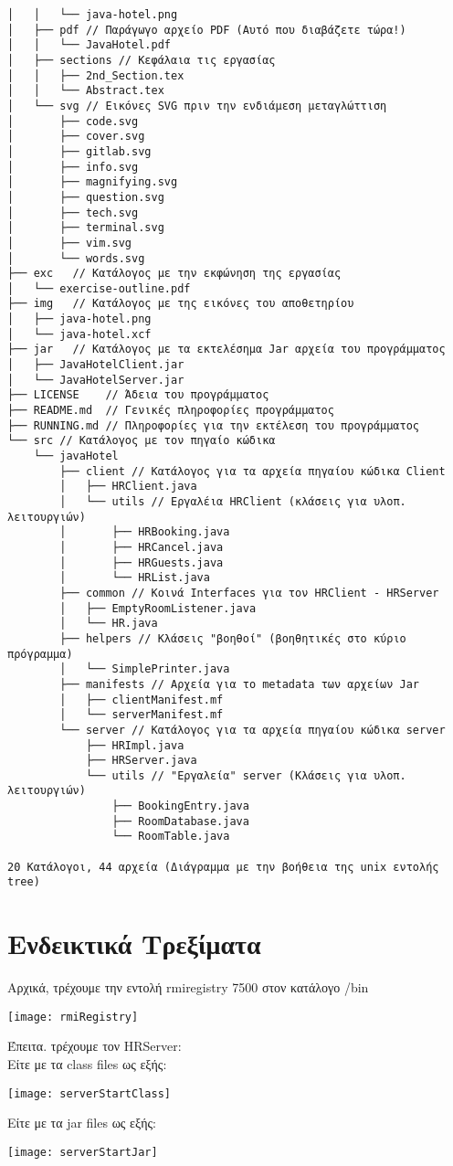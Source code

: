 \begin{verbatim}
│   │   └── java-hotel.png
│   ├── pdf // Παράγωγο αρχείο PDF (Αυτό που διαβάζετε τώρα!)
│   │   └── JavaHotel.pdf
│   ├── sections // Κεφάλαια τις εργασίας
│   │   ├── 2nd_Section.tex
│   │   └── Abstract.tex
│   └── svg // Εικόνες SVG πριν την ενδιάμεση μεταγλώττιση
│       ├── code.svg
│       ├── cover.svg
│       ├── gitlab.svg
│       ├── info.svg
│       ├── magnifying.svg
│       ├── question.svg
│       ├── tech.svg
│       ├── terminal.svg
│       ├── vim.svg
│       └── words.svg
├── exc   // Κατάλογος με την εκφώνηση της εργασίας
│   └── exercise-outline.pdf
├── img   // Κατάλογος με της εικόνες του αποθετηρίου
│   ├── java-hotel.png
│   └── java-hotel.xcf
├── jar   // Κατάλογος με τα εκτελέσημα Jar αρχεία του προγράμματος
│   ├── JavaHotelClient.jar
│   └── JavaHotelServer.jar
├── LICENSE    // Άδεια του προγράμματος
├── README.md  // Γενικές πληροφορίες προγράμματος
├── RUNNING.md // Πληροφορίες για την εκτέλεση του προγράμματος
└── src // Κατάλογος με τον πηγαίο κώδικα
    └── javaHotel
        ├── client // Κατάλογος για τα αρχεία πηγαίου κώδικα Client
        │   ├── HRClient.java
        │   └── utils // Εργαλέια HRClient (κλάσεις για υλοπ. λειτουργιών)
        │       ├── HRBooking.java
        │       ├── HRCancel.java
        │       ├── HRGuests.java
        │       └── HRList.java
        ├── common // Κοινά Interfaces για τον HRClient - HRServer
        │   ├── EmptyRoomListener.java
        │   └── HR.java
        ├── helpers // Κλάσεις "βοηθοί" (βοηθητικές στο κύριο πρόγραμμα)
        │   └── SimplePrinter.java
        ├── manifests // Αρχεία για το metadata των αρχείων Jar
        │   ├── clientManifest.mf
        │   └── serverManifest.mf
        └── server // Κατάλογος για τα αρχεία πηγαίου κώδικα server
            ├── HRImpl.java
            ├── HRServer.java
            └── utils // "Εργαλεία" server (Κλάσεις για υλοπ. λειτουργιών)
                ├── BookingEntry.java
                ├── RoomDatabase.java
                └── RoomTable.java

20 Κατάλογοι, 44 αρχεία (Διάγραμμα με την βοήθεια της unix εντολής tree)
\end{verbatim}
\normalsize
\clearpage
\section{Ενδεικτικά Τρεξίματα}
Αρχικά, τρέχουμε την εντολή rmiregistry 7500 στον κατάλογο /bin
\begin{center}
    \texttt{[image: rmiRegistry]}
\end{center}
Έπειτα. τρέχουμε τον HRServer:
\\
Είτε με τα class files ως εξής:
\begin{center}
    \texttt{[image: serverStartClass]}
\end{center}
Είτε με τα jar files ως εξής:
\begin{center}
    \texttt{[image: serverStartJar]}
\end{center}

